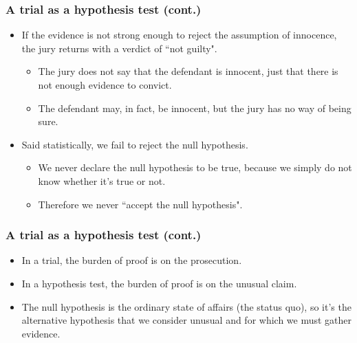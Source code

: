 
\begin{frame}
\frametitle{A trial as a hypothesis test (cont.)}

\begin{itemize}

\item If the evidence is not strong enough to reject the assumption of innocence, the jury returns with a verdict of ``not guilty".
\begin{itemize}
\item The jury does not say that the defendant is innocent, just that there is not enough evidence to convict.
\item The defendant may, in fact, be innocent, but the jury has no way of being sure.
\end{itemize}

\item Said statistically, we fail to reject the null hypothesis.
\begin{itemize}
\item We never declare the null hypothesis to be true, because we simply do not know whether it's true or not.
\item Therefore we never ``accept the null hypothesis".
\end{itemize}

\end{itemize}

\end{frame}


\begin{frame}
\frametitle{A trial as a hypothesis test (cont.)}

\begin{itemize}

\item In a trial, the burden of proof is on the prosecution.

\item In a hypothesis test, the burden of proof is on the unusual claim.

\item The null hypothesis is the ordinary state of affairs (the status quo), so it's the alternative hypothesis that we consider unusual and for which we must gather evidence.

\end{itemize}

\end{frame}

